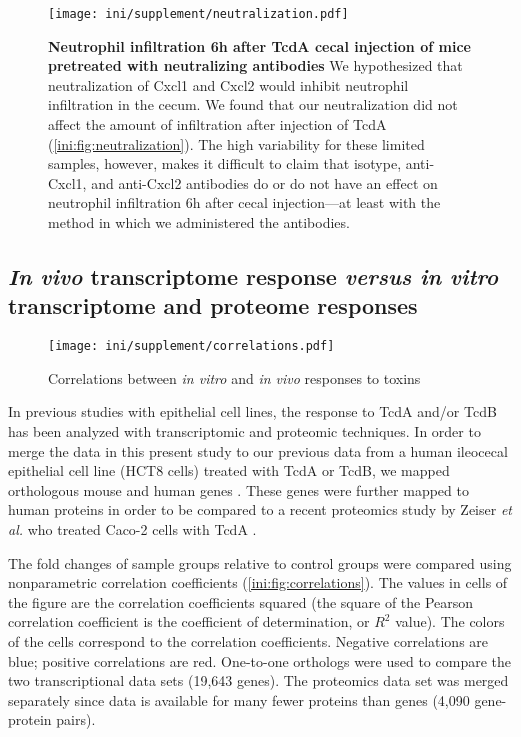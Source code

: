 \begin{figure}
\centering
\texttt{[image: ini/supplement/neutralization.pdf]}
\caption[Neutrophil infiltration 6h after TcdA cecal injection 
           of mice pretreated with neutralizing antibodies]
           {\textbf{Neutrophil infiltration 6h after TcdA cecal injection 
           of mice pretreated with neutralizing antibodies}
           We hypothesized that neutralization of Cxcl1 and Cxcl2
would inhibit neutrophil infiltration in the cecum. We found that 
our neutralization did not affect the amount of infiltration after injection
of TcdA (\autoref{ini:fig:neutralization}). The high variability for these 
limited samples, however,
makes it difficult to claim that isotype, anti-Cxcl1, and anti-Cxcl2 antibodies
do or do not have an effect on neutrophil infiltration 6h after cecal injection---at 
least with the method in which we administered the antibodies.
           }
\label{ini:fig:neutralization}
\end{figure}


\subsection{\emph{In vivo} transcriptome response \emph{versus
            in vitro} transcriptome and proteome responses}

\begin{figure}
\centering
\texttt{[image: ini/supplement/correlations.pdf]}
\caption{Correlations between \emph{in vitro} and \emph{in vivo} responses to toxins}
\label{ini:fig:correlations}
\end{figure}

In previous studies with epithelial cell lines, the response 
to TcdA and/or TcdB has been analyzed with transcriptomic and 
proteomic techniques. In order to merge the data in this present study
to our previous data from a human ileocecal epithelial
cell line (HCT8 cells) treated with TcdA or TcdB, we mapped orthologous
mouse and human genes \cite{DAuria:2012bd}. These genes were further mapped
to human proteins in order to be compared to a recent proteomics study
by Zeiser \emph{et al.} who treated Caco-2 cells with TcdA \cite{Zeiser:2013cu}.

The fold changes of sample groups relative
to control groups were compared using nonparametric correlation
coefficients (\autoref{ini:fig:correlations}). The values in cells of the figure
are the correlation coefficients squared (the square of the Pearson
correlation coefficient is the coefficient of determination, or $R^2$ value).
The colors of the cells correspond to the correlation coefficients. Negative
correlations are blue; positive correlations are red.
One-to-one orthologs were used to compare the two
transcriptional data sets (19,643 genes). The proteomics data
set was merged separately since data is available for many fewer
proteins than genes (4,090 gene-protein pairs).

